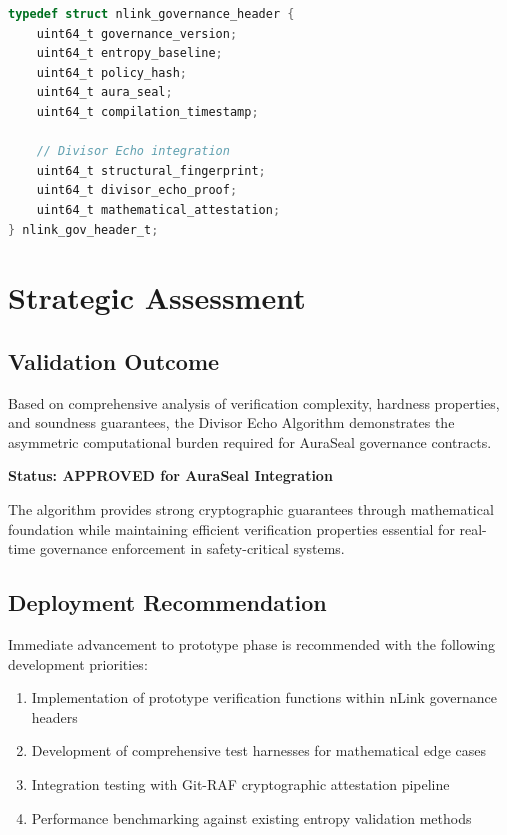 \documentclass[11pt,letterpaper]{article}
\begin{document}
\begin{lstlisting}[language=C, caption=nLink Governance Header with Divisor Echo]
typedef struct nlink_governance_header {
    uint64_t governance_version;
    uint64_t entropy_baseline;
    uint64_t policy_hash;
    uint64_t aura_seal;
    uint64_t compilation_timestamp;
    
    // Divisor Echo integration
    uint64_t structural_fingerprint;
    uint64_t divisor_echo_proof;
    uint64_t mathematical_attestation;
} nlink_gov_header_t;
\end{lstlisting}

\section{Strategic Assessment}

\subsection{Validation Outcome}

Based on comprehensive analysis of verification complexity, hardness properties, and soundness guarantees, the Divisor Echo Algorithm demonstrates the asymmetric computational burden required for AuraSeal governance contracts.

\textbf{Status: APPROVED for AuraSeal Integration}

The algorithm provides strong cryptographic guarantees through mathematical foundation while maintaining efficient verification properties essential for real-time governance enforcement in safety-critical systems.

\subsection{Deployment Recommendation}

Immediate advancement to prototype phase is recommended with the following development priorities:

\begin{enumerate}
\item Implementation of prototype verification functions within nLink governance headers
\item Development of comprehensive test harnesses for mathematical edge cases
\item Integration testing with Git-RAF cryptographic attestation pipeline
\item Performance benchmarking against existing entropy validation methods
\end{enumerate}
\end{document}
